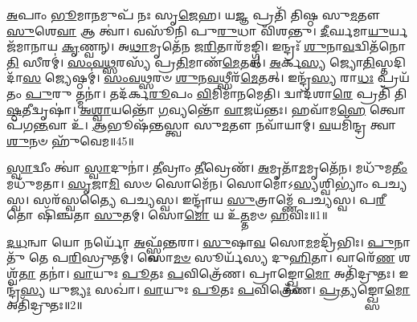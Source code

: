 \-\ul{𑌅}\-𑌪𑌾𑌂 \ul{𑌭𑍂}\-𑌮𑌾\-\ul{𑌨}\-𑌮𑍁𑌪᳴ 𑌨𑌃 𑌸𑍃\-\ul{𑌜𑍇}\-𑌹।
𑌯\-\ul{𑌜𑍍𑌞} 𑌪𑍍𑌰𑌤𑌿᳴ 𑌤𑌿𑌷𑍍𑌠 𑌸𑍁\-\ul{𑌮}\-𑌤𑍗 \ul{𑌸𑍁}\-𑌶𑍇\-\ul{𑌵𑌾} 𑌆 𑌤𑍍𑌵𑌾॑।
𑌵𑌸𑍂᳴𑌨𑌿 𑌪𑍁\-\ul{𑌰𑍁}\-𑌧𑌾 𑌵𑌿᳴𑌶𑌨𑍍𑌤𑍁।
\-\ul{𑌦𑍀}\-𑌰𑍍𑌘𑌮𑌾\-\ul{𑌯𑍁}\-𑌰𑍍𑌯𑌜᳴𑌮𑌾𑌨𑌾𑌯 \ul{𑌕𑍃}\-𑌣𑍍𑌵𑌨𑍍।
𑌅\-\ul{𑌥𑌾}\-𑌮𑍃𑌤𑍇᳴𑌨 𑌜\-\ul{𑌰𑌿}\-𑌤𑌾𑌰᳴𑌮𑌙𑍍𑌗𑍍𑌧𑌿।
𑌇𑌨𑍍𑌦𑍍𑌰𑌃᳴ \ul{𑌶𑍁}\-𑌨𑌾\-\ul{𑌵}\-𑌦𑍍𑌵𑌿𑌤᳴𑌨𑍋\-\ul{𑌤𑌿} 𑌸𑍀𑌰𑌮𑍍॑।
\-\ul{𑌸𑌂}\-\-\ul{𑌵}\-\-\ul{𑌥𑍍𑌸}\-𑌰𑌸𑍍𑌯᳴ 𑌪𑍍𑌰\-\ul{𑌤𑌿}\-𑌮𑌾𑌣᳴\-\ul{𑌮𑍇}\-𑌤𑌤𑍍।
\-\ul{𑌅}\-𑌰𑍍𑌕\-\ul{𑌸𑍍𑌯} 𑌜𑍍𑌯𑍋\-\ul{𑌤𑌿}\-𑌸𑍍𑌤𑌦𑌿𑌦𑌾᳴\-\ul{𑌸} 𑌜𑍍𑌯𑍇𑌷𑍍𑌠𑌮𑍍॑।
\-\ul{𑌸𑌂}\-\-\ul{𑌵}\-\-\ul{𑌥𑍍𑌸}\-𑌰𑍞 \ul{𑌶𑍁}\-𑌨\-\ul{𑌵}\-𑌥𑍍𑌸𑍀𑌰᳴\-\ul{𑌮𑍇}\-𑌤𑌤𑍍।
𑌇𑌨𑍍𑌦𑍍𑌰᳴\-\ul{𑌸𑍍𑌯} 𑌰𑌾\-\ul{𑌧𑌃} 𑌪𑍍𑌰𑌯᳴𑌤𑌂 \ul{𑌪𑍁}\-𑌰𑍁 𑌤𑍍𑌮𑌨𑌾॑।
𑌤𑌦᳴𑌰𑍍𑌕\-\ul{𑌰𑍂}\-𑌪𑌂 \ul{𑌵𑌿}\-𑌮𑌿𑌮𑌾᳴𑌨𑌮𑍇𑌤𑌿।
𑌦𑍍𑌵𑌾𑌦᳴𑌶𑌾\-\ul{𑌰𑍇} 𑌪𑍍𑌰𑌤𑌿᳴ 𑌤𑌿\-\ul{𑌷𑍍𑌠}\-𑌤𑍀𑌦𑍍𑌵𑍃𑌷𑌾॑।
\-\ul{𑌅}\-\-\ul{𑌶𑍍𑌵𑌾}\-𑌯𑌨𑍍𑌤𑍋᳴ \ul{𑌗}\-𑌵𑍍𑌯𑌨𑍍𑌤𑍋᳴ \ul{𑌵𑌾}\-𑌜𑌯᳴𑌨𑍍𑌤𑌃।
𑌹𑌵𑌾᳴𑌮\-\ul{𑌹𑍇} 𑌤𑍍𑌵𑍋𑌪᳴𑌗\-\ul{𑌨𑍍𑌤}\-𑌵𑌾 𑌉᳴।
\-\ul{𑌆}\-𑌭𑍂𑌷᳴𑌨𑍍𑌤𑌸𑍍𑌤𑍍𑌵𑌾 𑌸𑍁\-\ul{𑌮}\-𑌤𑍗 𑌨𑌵𑌾᳴𑌯𑌾𑌮𑍍।
\-\ul{𑌵}\-𑌯𑌮𑌿᳴𑌨𑍍𑌦𑍍𑌰 𑌤𑍍𑌵𑌾 \ul{𑌶𑍁}\-𑌨𑍞 𑌹𑍁᳴𑌵𑍇𑌮॥45॥




\clearpage
{}
\setcounter{anuvakam}{0}

\-\ul{𑌸𑍍𑌵𑌾}\-𑌦𑍍𑌵𑍀𑌂 𑌤𑍍𑌵𑌾॑ \ul{𑌸𑍍𑌵𑌾}\-𑌦𑍁𑌨𑌾॑।
\-\ul{𑌤𑍀}\-𑌵𑍍𑌰𑌾𑌂 \ul{𑌤𑍀}\-𑌵𑍍𑌰𑍇𑌣᳴।
\-\ul{𑌅}\-𑌮𑍃𑌤𑌾᳴\-\ul{𑌮}\-𑌮𑍃𑌤𑍇᳴𑌨।
𑌮𑌧𑍁᳴𑌮\-\ul{𑌤𑍀𑌂} 𑌮𑌧𑍁᳴𑌮𑌤𑌾।
\-\ul{𑌸𑍃}\-𑌜𑌾\-\ul{𑌮𑌿} 𑌸𑍞 𑌸𑍋𑌮𑍇᳴𑌨।
𑌸𑍋𑌮𑍋॑\-𑌽\-\ul{𑌸𑍍𑌯}\-𑌶𑍍𑌵𑌿𑌭𑍍𑌯𑌾𑌂॑ 𑌪𑌚𑍍𑌯𑌸𑍍𑌵।
𑌸𑌰᳴𑌸𑍍𑌵𑌤𑍍𑌯𑍈 𑌪𑌚𑍍𑌯𑌸𑍍𑌵।
𑌇𑌨𑍍𑌦𑍍𑌰𑌾᳴𑌯 \ul{𑌸𑍁}\-𑌤𑍍𑌰𑌾𑌮𑍍𑌣𑍇᳴ 𑌪𑌚𑍍𑌯𑌸𑍍𑌵।
𑌪\-\ul{𑌰𑍀}\-𑌤𑍋 𑌷𑌿᳴𑌞𑍍𑌚𑌤𑌾 \ul{𑌸𑍁}\-𑌤𑌮𑍍।
𑌸𑍋\-\ul{𑌮𑍋} 𑌯 𑌉᳴\-\ul{𑌤𑍍𑌤}\-𑌮𑍞 \ul{𑌹}\-𑌵𑌿𑌃॥1॥

\-\ul{𑌦}\-\-\ul{𑌧}\-𑌨𑍍𑌵𑌾 𑌯𑍋 𑌨𑌰𑍍𑌯𑍋᳴ \ul{𑌅}\-𑌫𑍍𑌸𑍍𑌵᳴𑌨𑍍𑌤𑌰𑌾।
\-\ul{𑌸𑍁}\-𑌷𑌾\-\ul{𑌵} 𑌸𑍋\-\ul{𑌮}\-𑌮𑌦𑍍𑌰𑌿᳴𑌭𑌿𑌃।
\-\ul{𑌪𑍁}\-𑌨𑌾𑌤𑍁᳴ 𑌤𑍇 𑌪\-\ul{𑌰𑌿}\-𑌸𑍍𑌰𑍁𑌤𑌮𑍍॑।
𑌸𑍋\-\ul{𑌮}\-\-\ul{𑍞} 𑌸𑍂𑌰𑍍𑌯᳴𑌸𑍍𑌯 𑌦𑍁\-\ul{𑌹𑌿}\-𑌤𑌾।
𑌵𑌾𑌰𑍇᳴\-\ul{𑌣} 𑌶𑌶𑍍𑌵᳴\-\ul{𑌤𑌾} 𑌤𑌨𑌾॑।
\-\ul{𑌵𑌾}\-𑌯𑍁𑌃 \ul{𑌪𑍂}\-𑌤𑌃 \ul{𑌪}\-𑌵𑌿𑌤𑍍𑌰𑍇᳴𑌣।
𑌪𑍍𑌰𑌾𑌙𑍍𑌖𑍍𑌸𑍋\-\ul{𑌮𑍋} 𑌅𑌤𑌿᳴𑌦𑍍𑌰𑍁𑌤𑌃।
𑌇𑌨𑍍𑌦𑍍𑌰᳴\-\ul{𑌸𑍍𑌯} 𑌯𑍁\-\ul{𑌜𑍍𑌯𑌃} 𑌸𑌖𑌾॑।
\-\ul{𑌵𑌾}\-𑌯𑍁𑌃 \ul{𑌪𑍂}\-𑌤𑌃 \ul{𑌪}\-𑌵𑌿𑌤𑍍𑌰𑍇᳴𑌣।
\-\ul{𑌪𑍍𑌰}\-𑌤𑍍𑌯𑌙𑍍𑌖𑍍𑌸𑍋\-\ul{𑌮𑍋} 𑌅𑌤𑌿᳴𑌦𑍍𑌰𑍁𑌤𑌃॥2॥

